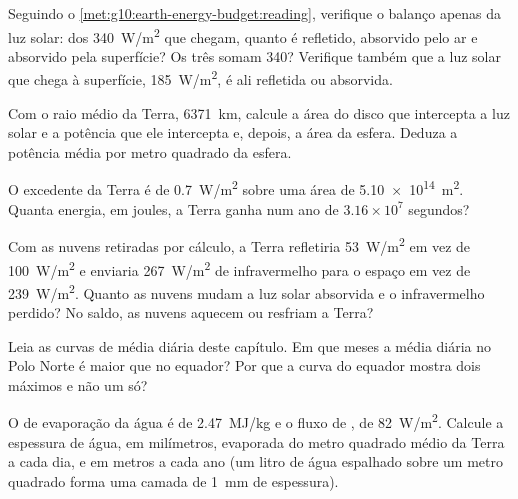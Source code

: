 \begin{exercise}[$\star\star$]\label{exo:g10:earth-energy-budget:7}
Seguindo o \cref{met:g10:earth-energy-budget:reading}, verifique o balanço
apenas da luz solar: dos \qty{340}{W/m^2} que chegam, quanto é refletido,
absorvido pelo ar e absorvido pela superfície? Os três somam 340? Verifique
também que a luz solar que chega à superfície, \qty{185}{W/m^2}, é ali
refletida ou absorvida.
\end{exercise}

\begin{exercise}[$\star\star$]\label{exo:g10:earth-energy-budget:8}
Com o raio médio da Terra, \qty{6371}{km}, calcule a área do disco que
intercepta a luz solar e a potência que ele intercepta e, depois, a área da
esfera. Deduza a potência média por metro quadrado da esfera.
\end{exercise}

\begin{exercise}[$\star\star$]\label{exo:g10:earth-energy-budget:9}
O excedente da Terra é de \qty{0.7}{W/m^2} sobre uma área de
\qty{5.10e14}{m^2}. Quanta energia, em joules, a Terra ganha num ano de
$3.16\times10^7$ segundos?
\end{exercise}

\begin{exercise}[$\star\star$]\label{exo:g10:earth-energy-budget:10}
Com as nuvens retiradas por cálculo, a Terra refletiria \qty{53}{W/m^2} em
vez de \qty{100}{W/m^2} e enviaria \qty{267}{W/m^2} de infravermelho para o
espaço em vez de \qty{239}{W/m^2}. Quanto as nuvens mudam a luz solar
absorvida e o infravermelho perdido? No saldo, as nuvens aquecem ou
resfriam a Terra?
\end{exercise}

\begin{exercise}[$\star\star$]\label{exo:g10:earth-energy-budget:11}
Leia as curvas de  média diária deste capítulo. Em que meses a
 média diária no Polo Norte é maior que no equador? Por que a
curva do equador mostra dois máximos e não um só?
\end{exercise}

\begin{exercise}[$\star\star\star$]\label{exo:g10:earth-energy-budget:12}
O  de evaporação da água é de \qty{2.47}{MJ/kg} e o fluxo de
, de \qty{82}{W/m^2}. Calcule a espessura de água, em
milímetros, evaporada do metro quadrado médio da Terra a cada dia, e em
metros a cada ano (um litro de água espalhado sobre um metro quadrado forma
uma camada de \qty{1}{mm} de espessura).
\end{exercise}

